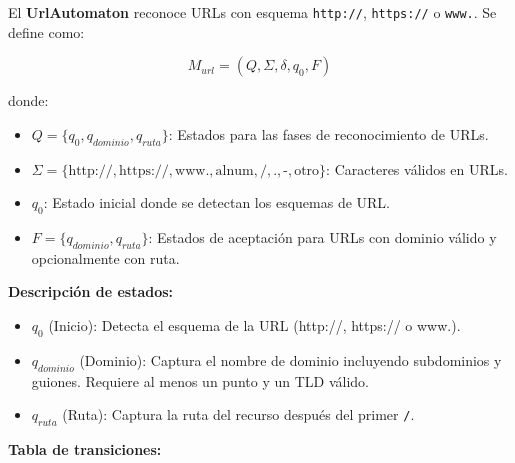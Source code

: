El \textbf{UrlAutomaton} reconoce URLs con esquema \texttt{http://}, \texttt{https://} o \texttt{www.}. Se define como:

\[
M_{url} = (Q, \Sigma, \delta, q_0, F)
\]

donde:
\begin{itemize}
    \item $Q = \{q_0, q_{dominio}, q_{ruta}\}$: Estados para las fases de reconocimiento de URLs.
    \item $\Sigma = \{\text{http://}, \text{https://}, \text{www.}, \text{alnum}, \text{/}, \text{.}, \text{-}, \text{otro}\}$: Caracteres válidos en URLs.
    \item $q_0$: Estado inicial donde se detectan los esquemas de URL.
    \item $F = \{q_{dominio}, q_{ruta}\}$: Estados de aceptación para URLs con dominio válido y opcionalmente con ruta.
\end{itemize}

\textbf{Descripción de estados:}
\begin{itemize}
    \item $q_0$ (Inicio): Detecta el esquema de la URL (http://, https:// o www.).
    \item $q_{dominio}$ (Dominio): Captura el nombre de dominio incluyendo subdominios y guiones. Requiere al menos un punto y un TLD válido.
    \item $q_{ruta}$ (Ruta): Captura la ruta del recurso después del primer \texttt{/}.
\end{itemize}

\textbf{Tabla de transiciones:}

